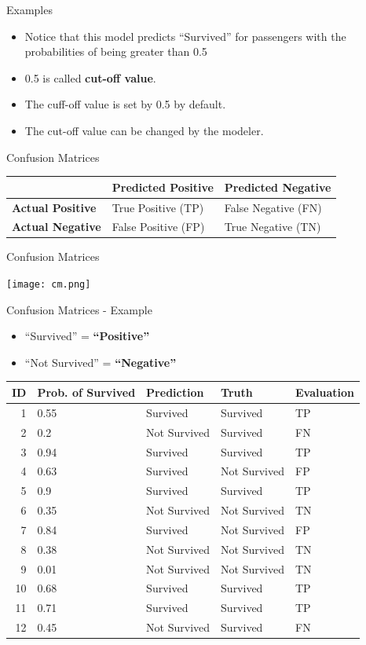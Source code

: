 \documentclass[
  ignorenonframetext,
]{beamer}
\providecommand{\tightlist}{%
  \setlength{\itemsep}{0pt}\setlength{\parskip}{0pt}}
\begin{document}
\begin{frame}{Examples}
\protect\hypertarget{examples-1}{}

\begin{itemize}
\tightlist
\item
  Notice that this model predicts ``Survived'' for passengers with the
  probabilities of being greater than 0.5
\item
  0.5 is called \textbf{cut-off value}.
\item
  The cuff-off value is set by 0.5 by default.
\item
  The cut-off value can be changed by the modeler.
\end{itemize}

\end{frame}

\begin{frame}{Confusion Matrices}
\protect\hypertarget{confusion-matrices}{}

\begin{longtable}[]{@{}lll@{}}
\toprule
& Predicted Positive & Predicted Negative\tabularnewline
\midrule
\endhead
\textbf{Actual Positive} & True Positive (TP) & False Negative
(FN)\tabularnewline
\textbf{Actual Negative} & False Positive (FP) & True Negative
(TN)\tabularnewline
\bottomrule
\end{longtable}

\end{frame}

\begin{frame}{Confusion Matrices}
\protect\hypertarget{confusion-matrices-1}{}

\texttt{[image: cm.png]}

\end{frame}

\begin{frame}{Confusion Matrices - Example}
\protect\hypertarget{confusion-matrices---example}{}

\begin{itemize}
\tightlist
\item
  ``Survived'' = \textbf{``Positive''}
\item
  ``Not Survived'' = \textbf{``Negative''}
\end{itemize}

\begin{longtable}[]{@{}rllll@{}}
\toprule
ID & Prob. of Survived & Prediction & Truth & Evaluation\tabularnewline
\midrule
\endhead
1 & 0.55 & Survived & Survived & TP\tabularnewline
2 & 0.2 & Not Survived & Survived & FN\tabularnewline
3 & 0.94 & Survived & Survived & TP\tabularnewline
4 & 0.63 & Survived & Not Survived & FP\tabularnewline
5 & 0.9 & Survived & Survived & TP\tabularnewline
6 & 0.35 & Not Survived & Not Survived & TN\tabularnewline
7 & 0.84 & Survived & Not Survived & FP\tabularnewline
8 & 0.38 & Not Survived & Not Survived & TN\tabularnewline
9 & 0.01 & Not Survived & Not Survived & TN\tabularnewline
10 & 0.68 & Survived & Survived & TP\tabularnewline
11 & 0.71 & Survived & Survived & TP\tabularnewline
12 & 0.45 & Not Survived & Survived & FN\tabularnewline
\bottomrule
\end{longtable}

\end{frame}
\end{document}
